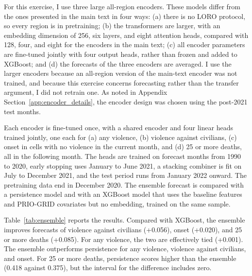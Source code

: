 \documentclass[11pt, letterpaper]{article}
\begin{document}
For this exercise, I use three large all-region encoders. These models differ from the ones presented in the main text in four ways: (a) there is no LORO protocol, so every region is in pretraining; (b) the transformers are larger, with an embedding dimension of 256, six layers, and eight attention heads, compared with 128, four, and eight for the encoders in the main text; (c) all encoder parameters are fine-tuned jointly with four output heads, rather than frozen and added to XGBoost; and (d) the forecasts of the three encoders are averaged. I use the larger encoders because an all-region version of the main-text encoder was not trained, and because this exercise concerns forecasting rather than the transfer argument, I did not retrain one. As noted in Appendix Section~\ref{app:encoder_details}, the encoder design was chosen using the post-2021 test months.

Each encoder is fine-tuned once, with a shared encoder and four linear heads trained jointly, one each for (a) any violence, (b) violence against civilians, (c) onset in cells with no violence in the current month, and (d) 25 or more deaths, all in the following month. The heads are trained on forecast months from 1990 to 2020, early stopping uses January to June 2021, a stacking combiner is fit on July to December 2021, and the test period runs from January 2022 onward. The pretraining data end in December 2020. The ensemble forecast is compared with a persistence model and with an XGBoost model that uses the baseline features and PRIO-GRID covariates but no embedding, trained on the same sample. 

Table~\ref{tab:ensemble} reports the results. Compared with XGBoost, the ensemble improves forecasts of violence against civilians (+0.056), onset (+0.020), and 25 or more deaths (+0.085). For any violence, the two are effectively tied (+0.001). The ensemble outperforms persistence for any violence, violence against civilians, and onset. For 25 or more deaths, persistence scores higher than the ensemble (0.418 against 0.375), but the interval for the difference includes zero. 
\end{document}
